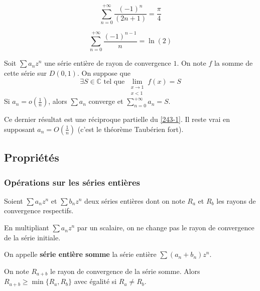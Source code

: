 	\begin{application}
		\[ \sum_{n=0}^{+\infty} \frac{(-1)^n}{(2n+1)} = \frac{\pi}{4} \]
	\end{application}

	\begin{application}
		\[ \sum_{n=0}^{+\infty} \frac{(-1)^{n-1}}{n} = \ln(2) \]
	\end{application}

	\begin{theorem}
		Soit $\sum a_n z^n$ une série entière de rayon de convergence $1$. On note $f$ la somme de cette série sur $D(0,1)$. On suppose que
		\[ \exists S \in \mathbb{C} \text{ tel que } \lim_{\substack{x \rightarrow 1 \\ x < 1}} f(x) = S \]
		Si $a_n = o \left( \frac{1}{n} \right)$, alors $\sum a_n$ converge et $\sum_{n=0}^{+\infty} a_n = S$.
	\end{theorem}

	\begin{remark}
		Ce dernier résultat est une réciproque partielle du \cref{243-1}. Il reste vrai en supposant $a_n = O \left( \frac{1}{n} \right)$ (c'est le théorème Taubérien fort).
	\end{remark}

	\subsection{Propriétés}

	\subsubsection{Opérations sur les séries entières}


	Soient $\sum a_n z^n$ et $\sum b_n z^n$ deux séries entières dont on note $R_a$ et $R_b$ les rayons de convergence respectifs.

	\begin{proposition}
		En multipliant $\sum a_n z^n$ par un scalaire, on ne change pas le rayon de convergence de la série initiale.
	\end{proposition}

	\begin{definition}
		On appelle \textbf{série entière somme} la série entière $\sum (a_n + b_n) z^n$.
	\end{definition}

	\begin{proposition}
		On note $R_{a+b}$ le rayon de convergence de la série somme. Alors $R_{a+b} \geq \min \{R_a, R_b\}$ avec égalité si $R_a \neq R_b$.
	\end{proposition}

